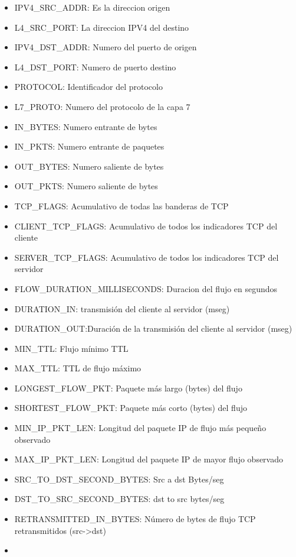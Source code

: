 \documentclass[
]{article}
\providecommand{\tightlist}{%
  \setlength{\itemsep}{0pt}\setlength{\parskip}{0pt}}
\begin{document}
\begin{itemize}
\tightlist
\item
  IPV4\_SRC\_ADDR: Es la direccion origen
\item
  L4\_SRC\_PORT: La direccion IPV4 del destino
\item
  IPV4\_DST\_ADDR: Numero del puerto de origen
\item
  L4\_DST\_PORT: Numero de puerto destino
\item
  PROTOCOL: Identificador del protocolo
\item
  L7\_PROTO: Numero del protocolo de la capa 7
\item
  IN\_BYTES: Numero entrante de bytes
\item
  IN\_PKTS: Numero entrante de paquetes
\item
  OUT\_BYTES: Numero saliente de bytes
\item
  OUT\_PKTS: Numero saliente de bytes
\item
  TCP\_FLAGS: Acumulativo de todas las banderas de TCP
\item
  CLIENT\_TCP\_FLAGS: Acumulativo de todos los indicadores TCP del
  cliente
\item
  SERVER\_TCP\_FLAGS: Acumulativo de todos los indicadores TCP del
  servidor
\item
  FLOW\_DURATION\_MILLISECONDS: Duracion del flujo en segundos
\item
  DURATION\_IN: transmisión del cliente al servidor (mseg)
\item
  DURATION\_OUT:Duración de la transmisión del cliente al servidor
  (mseg)
\item
  MIN\_TTL: Flujo mínimo TTL
\item
  MAX\_TTL: TTL de flujo máximo
\item
  LONGEST\_FLOW\_PKT: Paquete más largo (bytes) del flujo
\item
  SHORTEST\_FLOW\_PKT: Paquete más corto (bytes) del flujo
\item
  MIN\_IP\_PKT\_LEN: Longitud del paquete IP de flujo más pequeño
  observado
\item
  MAX\_IP\_PKT\_LEN: Longitud del paquete IP de mayor flujo observado
\item
  SRC\_TO\_DST\_SECOND\_BYTES: Src a dst Bytes/seg
\item
  DST\_TO\_SRC\_SECOND\_BYTES: dst to src bytes/seg
\item
  RETRANSMITTED\_IN\_BYTES: Número de bytes de flujo TCP retransmitidos
  (src-\textgreater dst)
\item

\end{itemize}
\end{document}
